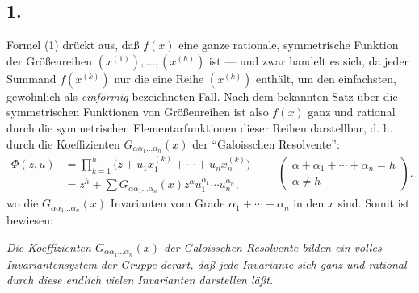 \subsection*{1.}
Formel (1) drückt aus, daß $f(x)$ eine ganze rationale, symmetrische Funktion der Größenreihen $(x^{(1)}),\ldots,(x^{(h)})$ ist --- und zwar handelt es sich, da jeder Summand $f(x^{(k)})$ nur die eine Reihe $(x^{(k)})$ enthält, um den einfachsten, gewöhnlich als \emph{einförmig} bezeichneten Fall. Nach dem bekannten Satz über die symmetrischen Funktionen von Größenreihen ist also $f(x)$ ganz und rational durch die symmetrischen Elementarfunktionen dieser Reihen darstellbar, d. h. durch die Koeffizienten $G_{\alpha\alpha_1\ldots\alpha_n}(x)$ der ``Galoisschen Resolvente'':
\[
\begin{aligned}
  \Phi(z,u)
  &=\prod_{k=1}^{h}\bigl(z+u_1x_1^{(k)}+\cdots+u_nx_n^{(k)}\bigr) \\
  &=z^h+
    \sum G_{\alpha\alpha_1\ldots\alpha_n}(x)
    z^{\alpha}u_1^{\alpha_1}\cdots u_n^{\alpha_n},
\end{aligned}
\qquad
\left(\begin{array}{c}
\alpha+\alpha_1+\cdots+\alpha_n=h\\
\alpha\ne h
\end{array}\right).
\]
wo die $G_{\alpha\alpha_1\ldots\alpha_n}(x)$ Invarianten vom Grade $\alpha_1+\cdots+\alpha_n$ in den $x$ sind. Somit ist bewiesen:

\emph{Die Koeffizienten $G_{\alpha\alpha_1\ldots\alpha_n}(x)$ der Galoisschen Resolvente bilden ein volles Invariantensystem der Gruppe derart, daß jede Invariante sich ganz und rational durch diese endlich vielen Invarianten darstellen läßt.}

